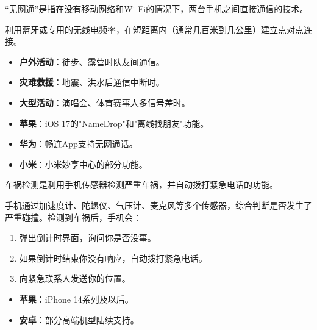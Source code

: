 
“无网通”是指在没有移动网络和Wi-Fi的情况下，两台手机之间直接通信的技术。


利用蓝牙或专用的无线电频率，在短距离内（通常几百米到几公里）建立点对点连接。


\begin{itemize}
  \item \textbf{户外活动}：徒步、露营时队友间通信。
  \item \textbf{灾难救援}：地震、洪水后通信中断时。
  \item \textbf{大型活动}：演唱会、体育赛事人多信号差时。
\end{itemize}


\begin{itemize}
  \item \textbf{苹果}：iOS 17的"NameDrop"和"离线找朋友"功能。
  \item \textbf{华为}：畅连App支持无网通话。
  \item \textbf{小米}：小米妙享中心的部分功能。
\end{itemize}


车祸检测是利用手机传感器检测严重车祸，并自动拨打紧急电话的功能。


手机通过加速度计、陀螺仪、气压计、麦克风等多个传感器，综合判断是否发生了严重碰撞。检测到车祸后，手机会：

\begin{enumerate}
  \item 弹出倒计时界面，询问你是否没事。
  \item 如果倒计时结束你没有响应，自动拨打紧急电话。
  \item 向紧急联系人发送你的位置。
\end{enumerate}


\begin{itemize}
  \item \textbf{苹果}：iPhone 14系列及以后。
  \item \textbf{安卓}：部分高端机型陆续支持。
\end{itemize}


